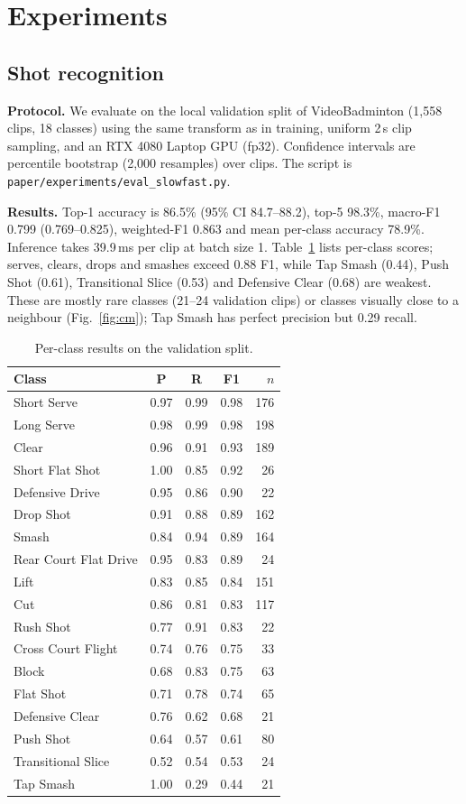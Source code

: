 \documentclass[10pt,journal]{IEEEtran}
\begin{document}
\section{Experiments}
\subsection{Shot recognition}
\textbf{Protocol.} We evaluate on the local validation split of VideoBadminton (1{,}558 clips, 18 classes) using the same transform as in training, uniform 2\,s clip sampling, and an RTX 4080 Laptop GPU (fp32). Confidence intervals are percentile bootstrap (2{,}000 resamples) over clips. The script is \texttt{paper/experiments/eval\_slowfast.py}.

\textbf{Results.} Top-1 accuracy is 86.5\% (95\% CI 84.7--88.2), top-5 98.3\%, macro-F1 0.799 (0.769--0.825), weighted-F1 0.863 and mean per-class accuracy 78.9\%. Inference takes 39.9\,ms per clip at batch size 1. Table~\ref{tab:cls} lists per-class scores; serves, clears, drops and smashes exceed 0.88 F1, while Tap Smash (0.44), Push Shot (0.61), Transitional Slice (0.53) and Defensive Clear (0.68) are weakest. These are mostly rare classes (21--24 validation clips) or classes visually close to a neighbour (Fig.~\ref{fig:cm}); Tap Smash has perfect precision but 0.29 recall.

\begin{table}[t]
\centering\caption{Per-class results on the validation split.}\label{tab:cls}
\small
\begin{tabular}{lcccr}
\toprule
Class & P & R & F1 & $n$\\
\midrule
Short Serve & 0.97 & 0.99 & 0.98 & 176\\
Long Serve & 0.98 & 0.99 & 0.98 & 198\\
Clear & 0.96 & 0.91 & 0.93 & 189\\
Short Flat Shot & 1.00 & 0.85 & 0.92 & 26\\
Defensive Drive & 0.95 & 0.86 & 0.90 & 22\\
Drop Shot & 0.91 & 0.88 & 0.89 & 162\\
Smash & 0.84 & 0.94 & 0.89 & 164\\
Rear Court Flat Drive & 0.95 & 0.83 & 0.89 & 24\\
Lift & 0.83 & 0.85 & 0.84 & 151\\
Cut & 0.86 & 0.81 & 0.83 & 117\\
Rush Shot & 0.77 & 0.91 & 0.83 & 22\\
Cross Court Flight & 0.74 & 0.76 & 0.75 & 33\\
Block & 0.68 & 0.83 & 0.75 & 63\\
Flat Shot & 0.71 & 0.78 & 0.74 & 65\\
Defensive Clear & 0.76 & 0.62 & 0.68 & 21\\
Push Shot & 0.64 & 0.57 & 0.61 & 80\\
Transitional Slice & 0.52 & 0.54 & 0.53 & 24\\
Tap Smash & 1.00 & 0.29 & 0.44 & 21\\
\bottomrule
\end{tabular}
\end{table}
\end{document}
